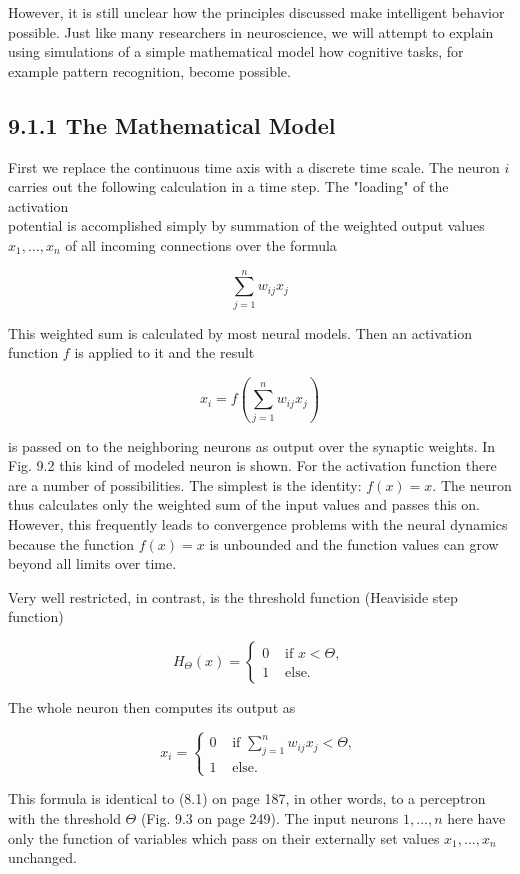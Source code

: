 \documentclass[10pt]{article}
\begin{document}
However, it is still unclear how the principles discussed make intelligent behavior possible. Just like many researchers in neuroscience, we will attempt to explain using simulations of a simple mathematical model how cognitive tasks, for example pattern recognition, become possible.

\subsection*{9.1.1 The Mathematical Model}
First we replace the continuous time axis with a discrete time scale. The neuron $i$ carries out the following calculation in a time step. The "loading" of the activation\\
potential is accomplished simply by summation of the weighted output values $x_{1}, \ldots, x_{n}$ of all incoming connections over the formula

$$
\sum_{j=1}^{n} w_{i j} x_{j}
$$

This weighted sum is calculated by most neural models. Then an activation function $f$ is applied to it and the result

$$
x_{i}=f\left(\sum_{j=1}^{n} w_{i j} x_{j}\right)
$$

is passed on to the neighboring neurons as output over the synaptic weights. In Fig. 9.2 this kind of modeled neuron is shown. For the activation function there are a number of possibilities. The simplest is the identity: $f(x)=x$. The neuron thus calculates only the weighted sum of the input values and passes this on. However, this frequently leads to convergence problems with the neural dynamics because the function $f(x)=x$ is unbounded and the function values can grow beyond all limits over time.

Very well restricted, in contrast, is the threshold function (Heaviside step function)

$$
H_{\Theta}(x)= \begin{cases}0 & \text { if } x<\Theta, \\ 1 & \text { else. }\end{cases}
$$

The whole neuron then computes its output as

$$
x_{i}= \begin{cases}0 & \text { if } \sum_{j=1}^{n} w_{i j} x_{j}<\Theta, \\ 1 & \text { else. }\end{cases}
$$

This formula is identical to (8.1) on page 187, in other words, to a perceptron with the threshold $\Theta$ (Fig. 9.3 on page 249). The input neurons $1, \ldots, n$ here have only the function of variables which pass on their externally set values $x_{1}, \ldots, x_{n}$ unchanged.
\end{document}
